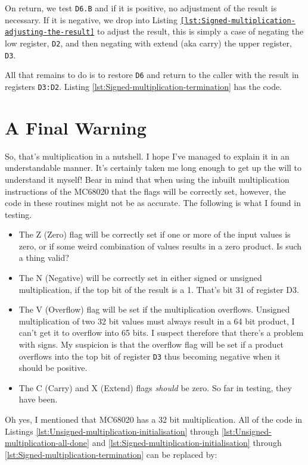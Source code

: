 On return, we test \texttt{D6.B} and if it is positive, no adjustment
of the result is necessary. If it is negative, we drop into Listing
\texttt{\ref{lst:Signed-multiplication-adjusting-the-result}} to
adjust the result, this is simply a case of negating the low register,
\texttt{D2}, and then negating with extend (aka carry) the upper register,
\texttt{D3}.



All that remains to do is to restore \texttt{D6} and return to the
caller with the result in registers \texttt{D3:D2}. Listing \ref{lst:Signed-multiplication-termination}
has the code.

\section{A Final Warning}

So, that's multiplication in a nutshell. I hope I've managed to explain
it in an understandable manner. It's certainly taken me long enough
to get up the will to understand it myself! Bear in mind that when
using the inbuilt multiplication instructions of the MC68020 that
the flags will be correctly set, however, the code in these routines
might not be as accurate. The following is what I found in testing.
\begin{itemize}
\item The Z (Zero) flag will be correctly set if one or more of the input
values is zero, or if some weird combination of values results in
a zero product. Is such a thing valid?
\item The N (Negative) will be correctly set in either signed or unsigned
multiplication, if the top bit of the result is a 1. That's bit 31
of register D3.
\item The V (Overflow) flag will be set if the multiplication overflows.
Unsigned multiplication of two 32 bit values must always result in
a 64 bit product, I can't get it to overflow into 65 bits. I suspect
therefore that there's a problem with signs. My suspicion is that
the overflow flag will be set if a product overflows into the top
bit of register \texttt{D3} thus becoming negative when it should
be positive.
\item The C (Carry) and X (Extend) flags \emph{should} be zero. So far in
testing, they have been.
\end{itemize}
Oh yes, I mentioned that MC68020 has a 32 bit multiplication. All
of the code in Listings \ref{lst:Unsigned-multiplication-initialisation}
through \ref{lst:Unsigned-multiplication-all-done} and \ref{lst:Signed-multiplication-initialisation}
through \ref{lst:Signed-multiplication-termination} can be replaced
by:

